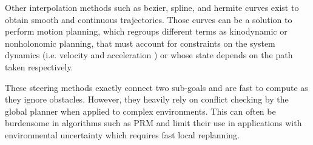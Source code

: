 Other interpolation methods such as bezier, spline, and hermite curves exist to obtain smooth and continuous trajectories.
Those curves can be a solution to perform motion planning, which regroups different terms as kinodynamic \cite{randomized_kino_planning_lavalle_2001, DIMT} or nonholonomic planning, that must account for constraints on the system dynamics (i.e. velocity and acceleration ) or whose state depends on the path taken respectively.

These steering methods exactly connect two sub-goals and are fast to compute as they ignore obstacles.
However, they heavily rely on conflict checking by the global planner when applied to complex environments. 
This can often be burdensome in algorithms such as PRM and limit their use in applications with environmental uncertainty which requires fast local replanning.\\

